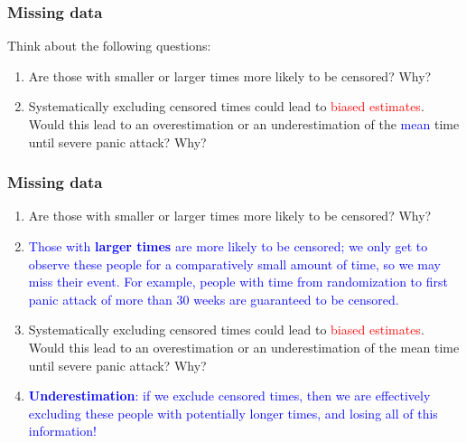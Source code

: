 \documentclass[10pt,t]{beamer}
\begin{document}
\begin{frame}
\frametitle{Missing data}
Think about the following questions:
\begin{enumerate}
\item Are those with smaller or larger times more likely to be censored? Why?\pause 
\item Systematically excluding censored times could lead to \textcolor{red}{biased estimates}. Would this lead to an overestimation or an underestimation of the \textcolor{blue}{mean} time until severe panic attack? Why?
\end{enumerate}

\end{frame}

\begin{frame}
\frametitle{Missing data}
\begin{enumerate}
\item Are those with smaller or larger times more likely to be censored? Why?
\item[] \textcolor{blue}{Those with \textbf{larger times} are more likely to be censored; we only get to observe these people for a comparatively small amount of time, so we may miss their event. For example, people with time from randomization to first panic attack of more than 30 weeks are guaranteed to be censored.}\pause 
\item Systematically excluding censored times could lead to \textcolor{red}{biased estimates}. Would this lead to an overestimation or an underestimation of the mean time until severe panic attack? Why?
\item[] \textcolor{blue}{\textbf{Underestimation}: if we exclude censored times, then we are effectively excluding these people with potentially longer times, and losing all of this information!}
\end{enumerate}

\end{frame}
\end{document}
